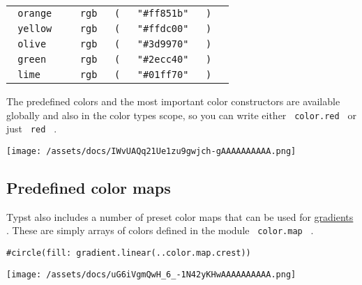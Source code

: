 \begin{longtable}[]{@{}ll@{}}
\texttt{\ orange\ } &
\texttt{\ }{\texttt{\ rgb\ }}\texttt{\ }{\texttt{\ (\ }}\texttt{\ }{\texttt{\ "\#ff851b"\ }}\texttt{\ }{\texttt{\ )\ }}\texttt{\ } \\
\texttt{\ yellow\ } &
\texttt{\ }{\texttt{\ rgb\ }}\texttt{\ }{\texttt{\ (\ }}\texttt{\ }{\texttt{\ "\#ffdc00"\ }}\texttt{\ }{\texttt{\ )\ }}\texttt{\ } \\
\texttt{\ olive\ } &
\texttt{\ }{\texttt{\ rgb\ }}\texttt{\ }{\texttt{\ (\ }}\texttt{\ }{\texttt{\ "\#3d9970"\ }}\texttt{\ }{\texttt{\ )\ }}\texttt{\ } \\
\texttt{\ green\ } &
\texttt{\ }{\texttt{\ rgb\ }}\texttt{\ }{\texttt{\ (\ }}\texttt{\ }{\texttt{\ "\#2ecc40"\ }}\texttt{\ }{\texttt{\ )\ }}\texttt{\ } \\
\texttt{\ lime\ } &
\texttt{\ }{\texttt{\ rgb\ }}\texttt{\ }{\texttt{\ (\ }}\texttt{\ }{\texttt{\ "\#01ff70"\ }}\texttt{\ }{\texttt{\ )\ }}\texttt{\ } \\
\end{longtable}

The predefined colors and the most important color constructors are
available globally and also in the color type\textquotesingle s scope,
so you can write either \texttt{\ color.red\ } or just \texttt{\ red\ }
.

\texttt{[image: /assets/docs/IWvUAQq21Ue1zu9gwjch-gAAAAAAAAAA.png]}

\subsection{Predefined color maps}\label{predefined-color-maps}

Typst also includes a number of preset color maps that can be used for
\href{/docs/reference/visualize/gradient/\#definitions-linear}{gradients}
. These are simply arrays of colors defined in the module
\texttt{\ color.map\ } .

\begin{verbatim}
#circle(fill: gradient.linear(..color.map.crest))
\end{verbatim}

\texttt{[image: /assets/docs/uG6iVgmQwH\_6\_-1N42yKHwAAAAAAAAAA.png]}


